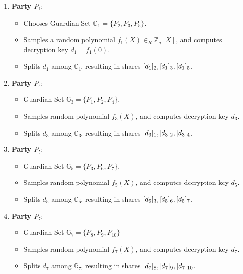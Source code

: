 \documentclass[runningheads]{llncs}
\begin{document}
\begin{enumerate}
    \item \textbf{Party $P_1$}:
    \begin{itemize}
        \item Chooses Guardian Set $\mathbb{G}_1 = \{P_2, P_3, P_5\}$.
        \item Samples a random polynomial $f_1(X) \in_R \mathbb{Z}_q[X]$, and computes decryption key $d_1 = f_1(0)$.
        \item Splits $d_1$ among $\mathbb{G}_1$, resulting in shares $[d_{1}]_{2}, [d_{1}]_{3}, [d_{1}]_{5}$.
    \end{itemize}

    \item \textbf{Party $P_3$}:
    \begin{itemize}
        \item Guardian Set $\mathbb{G}_3 = \{P_1, P_2, P_4\}$.
        \item Samples random polynomial $f_3(X)$, and computes decryption key $d_3$.
        \item Splits $d_3$ among $\mathbb{G}_3$, resulting in shares $[d_{3}]_{1}, [d_{3}]_{2}, [d_{3}]_{4}$.
    \end{itemize}

    \item \textbf{Party $P_5$}:
    \begin{itemize}
        \item Guardian Set $\mathbb{G}_5 = \{P_3, P_6, P_7\}$.
        \item Samples random polynomial $f_5(X)$, and computes decryption key $d_5$.
        \item Splits $d_5$ among $\mathbb{G}_5$, resulting in shares $[d_{5}]_{3}, [d_{5}]_{6}, [d_{5}]_{7}$.
    \end{itemize}

    \item \textbf{Party $P_7$}:
    \begin{itemize}
        \item Guardian Set $\mathbb{G}_7 = \{P_8, P_9, P_{10}\}$.
        \item Samples random polynomial $f_7(X)$, and computes decryption key $d_7$.
        \item Splits $d_7$ among $\mathbb{G}_7$, resulting in shares $[d_{7}]_{8}, [d_{7}]_{9}, [d_{7}]_{10}$.
    \end{itemize}


\end{enumerate}
\end{document}

